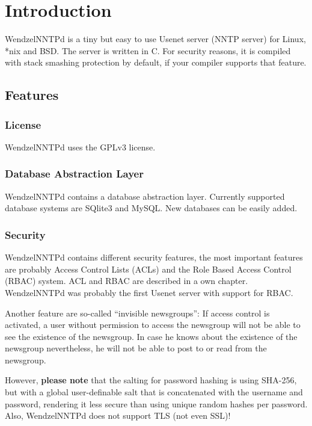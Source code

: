 \chapter{Introduction}

WendzelNNTPd is a tiny but easy to use Usenet server (NNTP server) for Linux, *nix and BSD. The server is written in C. For security reasons, it is compiled with stack smashing protection by default, if your compiler supports that feature.

\section{Features}

\subsection{License}

WendzelNNTPd uses the GPLv3 license.

\subsection{Database Abstraction Layer}

WendzelNNTPd contains a database abstraction layer. Currently supported database systems are SQlite3 and MySQL. New databases can be easily added.

\subsection{Security}

WendzelNNTPd contains different security features, the most important features are probably Access Control Lists (ACLs) and the Role Based Access Control (RBAC) system. ACL and RBAC are described in a own chapter. WendzelNNTPd was probably the first Usenet server with support for RBAC.

Another feature are so-called ``invisible newsgroups'': If access control is activated, a user without permission to access the newsgroup will not be able to see the existence of the newsgroup. In case he knows about the existence of the newsgroup nevertheless, he will not be able to post to or read from the newsgroup.

However, \textbf{please note} that the salting for password hashing is using SHA-256, but with a global user-definable salt that is concatenated with the username and password, rendering it less secure than using unique random hashes per password. Also, WendzelNNTPd does not support TLS (not even SSL)!


